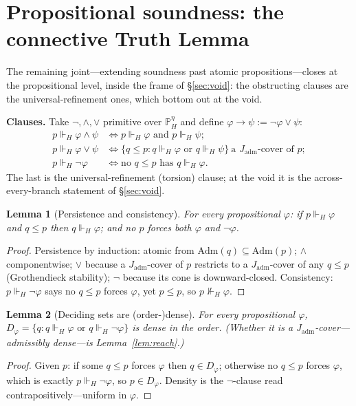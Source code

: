 \documentclass[11pt]{article}
\newtheorem{lemma}{Lemma}
\theoremstyle{definition}
\theoremstyle{remark}
\newcommand{\forcesH}{\Vdash_{H}}
\newcommand{\PHeta}{\mathbb{P}_{H}^{\eta}}
\newcommand{\refines}{\leq}
\newcommand{\Adm}{\mathrm{Adm}}
\newcommand{\Jadm}{J_{\mathrm{adm}}}
\begin{document}
\section{Propositional soundness: the connective Truth Lemma}\label{sec:atomic}

The remaining joint---extending soundness past atomic propositions---closes at the propositional level,
inside the frame of \S\ref{sec:void}: the obstructing clauses are the universal-refinement ones, which
bottom out at the void.

\medskip\noindent\textbf{Clauses.} Take $\neg,\wedge,\vee$ primitive over $\PHeta$ and define
$\varphi\to\psi:=\neg\varphi\vee\psi$:
\begin{align*}
p\forcesH\varphi\wedge\psi &\iff p\forcesH\varphi \text{ and } p\forcesH\psi;\\
p\forcesH\varphi\vee\psi &\iff \{q\refines p: q\forcesH\varphi \text{ or } q\forcesH\psi\}\ \text{a }\Jadm\text{-cover of }p;\\
p\forcesH\neg\varphi &\iff \text{no } q\refines p \text{ has } q\forcesH\varphi.
\end{align*}
The last is the universal-refinement (torsion) clause; at the void it is the across-every-branch
statement of \S\ref{sec:void}.

\begin{lemma}[Persistence and consistency]\label{lem:pers}
For every propositional $\varphi$: if $p\forcesH\varphi$ and $q\refines p$ then $q\forcesH\varphi$; and
no $p$ forces both $\varphi$ and $\neg\varphi$.
\end{lemma}
\begin{proof}
Persistence by induction: atomic from $\Adm(q)\subseteq\Adm(p)$; $\wedge$ componentwise; $\vee$
because a $\Jadm$-cover of $p$ restricts to a $\Jadm$-cover of any $q\refines p$ (Grothendieck
stability); $\neg$ because its cone is downward-closed. Consistency: $p\forcesH\neg\varphi$ says no
$q\refines p$ forces $\varphi$, yet $p\refines p$, so $p\not\forcesH\varphi$.
\end{proof}

\begin{lemma}[Deciding sets are (order-)dense]\label{lem:dec}
For every propositional $\varphi$, $D_\varphi=\{q:q\forcesH\varphi \text{ or } q\forcesH\neg\varphi\}$
is dense in the order. (Whether it is a $\Jadm$-cover---admissibly dense---is Lemma~\ref{lem:reach}.)
\end{lemma}
\begin{proof}
Given $p$: if some $q\refines p$ forces $\varphi$ then $q\in D_\varphi$; otherwise no $q\refines p$
forces $\varphi$, which is exactly $p\forcesH\neg\varphi$, so $p\in D_\varphi$. Density is the
$\neg$-clause read contrapositively---uniform in $\varphi$.
\end{proof}
\end{document}
